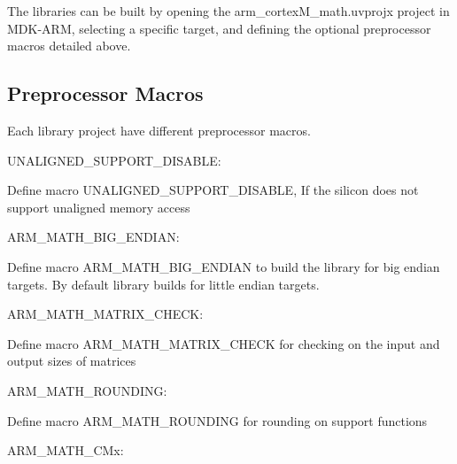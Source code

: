 The libraries can be built by opening the arm\+\_\+cortex\+M\+\_\+math.\+uvprojx project in M\+D\+K-\/\+A\+RM, selecting a specific target, and defining the optional preprocessor macros detailed above.

\subsection*{Preprocessor Macros }

Each library project have different preprocessor macros.


\begin{DoxyItemize}
\item U\+N\+A\+L\+I\+G\+N\+E\+D\+\_\+\+S\+U\+P\+P\+O\+R\+T\+\_\+\+D\+I\+S\+A\+B\+LE\+:
\end{DoxyItemize}

Define macro U\+N\+A\+L\+I\+G\+N\+E\+D\+\_\+\+S\+U\+P\+P\+O\+R\+T\+\_\+\+D\+I\+S\+A\+B\+LE, If the silicon does not support unaligned memory access


\begin{DoxyItemize}
\item A\+R\+M\+\_\+\+M\+A\+T\+H\+\_\+\+B\+I\+G\+\_\+\+E\+N\+D\+I\+AN\+:
\end{DoxyItemize}

Define macro A\+R\+M\+\_\+\+M\+A\+T\+H\+\_\+\+B\+I\+G\+\_\+\+E\+N\+D\+I\+AN to build the library for big endian targets. By default library builds for little endian targets.


\begin{DoxyItemize}
\item A\+R\+M\+\_\+\+M\+A\+T\+H\+\_\+\+M\+A\+T\+R\+I\+X\+\_\+\+C\+H\+E\+CK\+:
\end{DoxyItemize}

Define macro A\+R\+M\+\_\+\+M\+A\+T\+H\+\_\+\+M\+A\+T\+R\+I\+X\+\_\+\+C\+H\+E\+CK for checking on the input and output sizes of matrices


\begin{DoxyItemize}
\item A\+R\+M\+\_\+\+M\+A\+T\+H\+\_\+\+R\+O\+U\+N\+D\+I\+NG\+:
\end{DoxyItemize}

Define macro A\+R\+M\+\_\+\+M\+A\+T\+H\+\_\+\+R\+O\+U\+N\+D\+I\+NG for rounding on support functions


\begin{DoxyItemize}
\item A\+R\+M\+\_\+\+M\+A\+T\+H\+\_\+\+C\+Mx\+:
\end{DoxyItemize}

